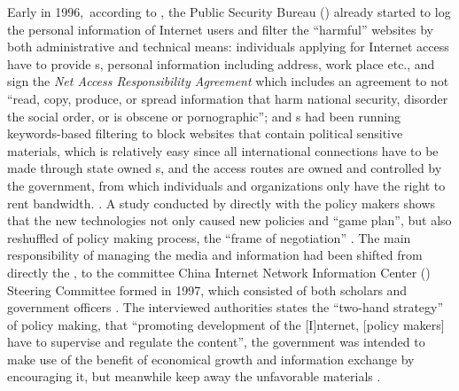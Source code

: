 Early in 1996,\ according to \citet{barme_great_1997}, the Public Security Bureau (\psb) already started to log the personal information of Internet users and filter the ``harmful'' websites by both administrative and technical means: individuals applying for Internet access have to provide s, personal information including address, work place etc., and sign the \textit{Net Access Responsibility Agreement} which includes an agreement to not ``read, copy, produce, or spread information that harm national security, disorder the social order, or is obscene or pornographic''; and \isp s had been running keywords-based filtering to block websites that contain political sensitive materials, which is relatively easy since all international connections have to be made through state owned \isp s, and the access routes are owned and controlled by the government, from which individuals and organizations only have the right to rent bandwidth.  \citep{herold_escaping_2012,herold_noise_2011,barme_great_1997}. A study conducted by \citet{zhang_behind_2006} directly with the policy makers shows that the new technologies not only caused new policies and ``game plan'', but also reshuffled of policy making process, the ``frame of negotiation'' \citep[p.~147]{price_media_2002}. The main responsibility of managing the media and information had been shifted from directly the \cpc, to the committee China Internet Network Information Center (\cnnic) Steering Committee formed in 1997, which consisted of both scholars and government officers \citep[p.~281]{zhang_behind_2006}. The interviewed authorities states the ``two-hand strategy'' of policy making, that ``promoting development of the [I]nternet, [policy makers] have to supervise and regulate the content'', the government was intended to make use of the benefit of economical growth and information exchange by encouraging it, but meanwhile keep away the unfavorable materials \citep{zhang_behind_2006}.

